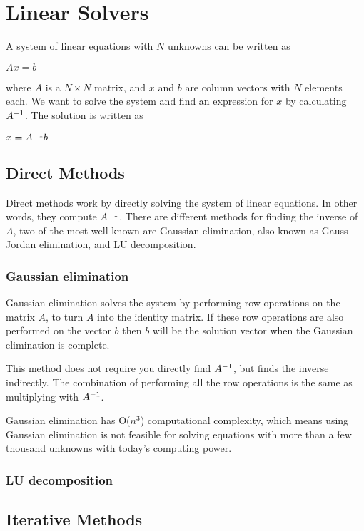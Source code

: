 \section*{Linear Solvers}

A system of linear equations with $N$ unknowns can be written as 

$Ax = b$

where $A$ is a $N \times N$ matrix, and $x$ and $b$ are column vectors with $N$ 
elements each. We want to solve the system and find an expression for $x$ by calculating
${A}^{-1}$. The solution is written as 

$x = {A}^{-1}b$

\subsection*{Direct Methods}

Direct methods work by directly solving the system of linear equations. In other 
words, they compute ${A}^{-1}$. There are different methods for finding the inverse
of $A$, two of the most well known are Gaussian elimination, also known as Gauss-
Jordan elimination, and LU decomposition.

\subsubsection*{Gaussian elimination}

Gaussian elimination solves the system by performing row operations on the matrix 
$A$, to turn $A$ into the identity matrix. If these row operations are also performed 
on the vector $b$ then $b$ will be the solution vector when the Gaussian elimination 
is complete.

This method does not require you directly find ${A}^{-1}$, but finds the inverse 
indirectly. The combination of performing all the row operations is the same as 
multiplying with ${A}^{-1}$.

Gaussian elimination has O($n^3$) computational complexity, which means using 
Gaussian elimination is not feasible for solving equations with more than a few 
thousand unknowns with today's computing power.

\subsubsection*{LU decomposition}

\subsection*{Iterative Methods}

